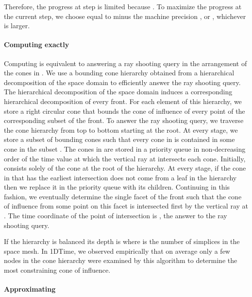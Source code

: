 \documentclass[twocolumn]{article}
\begin{document}
Therefore, the progress  at step  is limited
because .
To maximize the progress at the current step, we choose 
equal to  minus the machine precision , or , whichever is larger.

\paragraph{Computing  exactly}

Computing  is equivalent to answering a ray
shooting query in the arrangement of the cones in
.  We use a bounding cone hierarchy
 obtained from a hierarchical decomposition of the space
domain to efficiently answer the ray shooting query.  The hierarchical
decomposition of the space domain induces a corresponding hierarchical
decomposition of every front.  For each element of this hierarchy, we
store a right circular cone that bounds the cone of influence of every
point of the corresponding subset of the front.  To answer the ray
shooting query, we traverse the cone hierarchy from top to bottom
starting at the root.  At every stage, we store a subset 
of bounding cones such that every cone in
 is contained in some cone in the subset
.  The cones in  are stored in a priority
queue in non-decreasing order of the time value at which the vertical
ray at  intersects each cone.  Initially,  consists
solely of the cone at the root of the hierarchy.  At every stage, if
the cone in  that has the earliest intersection does not
come from a leaf in the hierarchy then we replace it in the priority
queue with its children.  Continuing in this fashion, we eventually
determine the single facet of the front such that the cone of
influence from some point on this facet is intersected first by the
vertical ray at .  The time coordinate of the point of
intersection is , the answer to the ray shooting
query.

If the hierarchy is balanced its depth is  where  is the
number of simplices in the space mesh.  In 1DTime, we observed
empirically that on average only a few nodes in the cone hierarchy
were examined by this algorithm to determine the most constraining
cone of influence.




\paragraph{Approximating }
\end{document}
